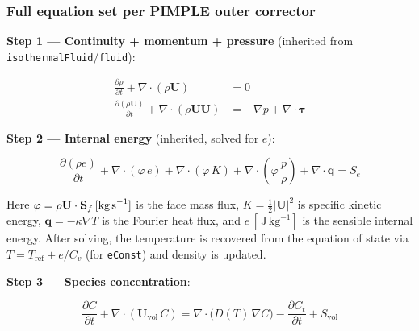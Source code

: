 \documentclass[11pt,a4paper]{article}
\newcommand{\pder}[2]{\frac{\partial #1}{\partial #2}}
\newcommand{\J}{\,\text{J}}
\begin{document}
\subsubsection{Full equation set per PIMPLE outer corrector}

\textbf{Step 1 — Continuity + momentum + pressure} (inherited from
\texttt{isothermalFluid}/\texttt{fluid}):

\begin{tcolorbox}[eqbox,title={Compressible continuity and momentum}]
\begin{align}
  \pder{\rho}{t} + \nabla\cdot(\rho\mathbf{U}) &= 0 \label{eq:cont_comp} \\[4pt]
  \pder{(\rho\mathbf{U})}{t} + \nabla\cdot(\rho\mathbf{U}\mathbf{U})
  &= -\nabla p + \nabla\cdot\boldsymbol{\tau} \label{eq:mom_comp}
\end{align}
\end{tcolorbox}

\textbf{Step 2 — Internal energy} (inherited, solved for $e$):

\begin{tcolorbox}[eqbox,title={Compressible energy equation (\texttt{fluid} base)}]
\begin{equation}\label{eq:energy_comp}
  \pder{(\rho e)}{t}
  + \nabla\cdot(\varphi\, e)
  + \nabla\cdot(\varphi\, K)
  + \nabla\cdot\!\left(\varphi\,\frac{p}{\rho}\right)
  + \nabla\cdot\mathbf{q}
  = S_e
\end{equation}
\end{tcolorbox}

Here $\varphi = \rho\mathbf{U}\cdot\mathbf{S}_f\,[\text{kg\,s}^{-1}]$ is the
face mass flux, $K = \tfrac{1}{2}|\mathbf{U}|^2$ is specific kinetic energy,
$\mathbf{q} = -\kappa\nabla T$ is the Fourier heat flux, and
$e\,[\J\,\text{kg}^{-1}]$ is the sensible internal energy.  After solving,
the temperature is recovered from the equation of state via
$T = T_\text{ref} + e/C_v$ (for \texttt{eConst}) and density is updated.

\textbf{Step 3 — Species concentration}:

\begin{tcolorbox}[eqbox,title={Species equation — \texttt{compressibleSpeciesFluid}}]
\begin{equation}\label{eq:comp_C}
  \pder{C}{t}
  + \nabla\cdot(\mathbf{U}_\text{vol}\,C)
  = \nabla\cdot\!\bigl(D(T)\,\nabla C\bigr)
  - \pder{C_t}{t}
  + S_\text{vol}
\end{equation}
\end{tcolorbox}
\end{document}
